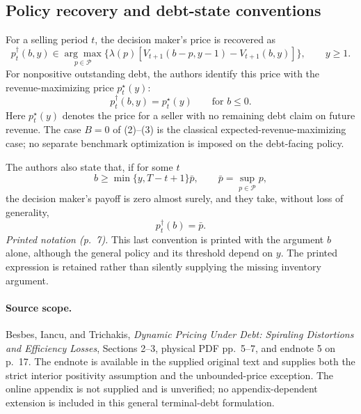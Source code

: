 \documentclass{article}
\begin{document}
\subsection*{Policy recovery and debt-state conventions}

For a selling period \(t\), the decision maker's price is recovered as
\[
p_t^{\dagger}(b,y)\in
\underset{p\in\mathcal P}{\arg\max}
\bigl\{\lambda(p)
[V_{t+1}(b-p,y-1)-V_{t+1}(b,y)]\bigr\},
\qquad y\ge1.
\]
For nonpositive outstanding debt, the authors identify this price with the revenue-maximizing price \(p_t^{\star}(y)\):
\[
p_t^{\dagger}(b,y)=p_t^{\star}(y)
\qquad\text{for }b\le0.
\]
Here \(p_t^{\star}(y)\) denotes the price for a seller with no remaining debt claim on future revenue. The case \(B=0\) of (2)--(3) is the classical expected-revenue-maximizing case; no separate benchmark optimization is imposed on the debt-facing policy.

The authors also state that, if for some \(t\)
\[
b\ge\min\{y,T-t+1\}\bar p,
\qquad
\bar p=\sup_{p\in\mathcal P}p,
\]
the decision maker's payoff is zero almost surely, and they take, without loss of generality,
\[
p_t^{\dagger}(b)=\bar p.
\]
\emph{Printed notation (p.~7).} This last convention is printed with the argument \(b\) alone, although the general policy and its threshold depend on \(y\). The printed expression is retained rather than silently supplying the missing inventory argument.

\paragraph{Source scope.}
Besbes, Iancu, and Trichakis, \emph{Dynamic Pricing Under Debt: Spiraling Distortions and Efficiency Losses}, Sections 2--3, physical PDF pp.~5--7, and endnote 5 on p.~17. The endnote is available in the supplied original text and supplies both the strict interior positivity assumption and the unbounded-price exception. The online appendix is not supplied and is unverified; no appendix-dependent extension is included in this general terminal-debt formulation.
\end{document}
